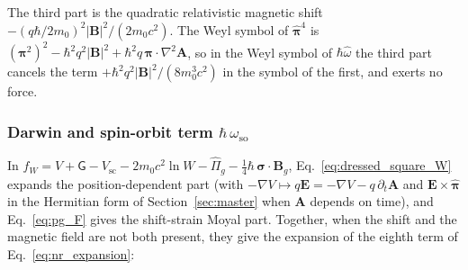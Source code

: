\documentclass[aps,prd,onecolumn,tightenlines,nofootinbib,notitlepage,11pt,floatfix]{revtex4-2}
\theoremstyle{indentedtheorem}
\begin{document}
The third part is the quadratic relativistic magnetic shift $-(q\hbar/2m_0)^2|\mathbf{B}|^2/(2m_0c^2)$. The Weyl symbol of $\hat{\boldsymbol{\pi}}^4$ is $(\boldsymbol{\pi}^2)^2-\hbar^2q^2|\mathbf{B}|^2+\hbar^2q\,\boldsymbol{\pi}\cdot\nabla^2\mathbf{A}$, so in the Weyl symbol of $\hbar\hat{\omega}$ the third part cancels the term $+\hbar^2q^2|\mathbf{B}|^2/(8m_0^3c^2)$ in the symbol of the first, and exerts no force.

\subsubsection{Darwin and spin-orbit term \texorpdfstring{$\hbar\,\omega_\text{so}$}{hbar omega so}}
\label{sec:term_so}

In $f_W = V + \mathsf{G} - V_\text{sc} - 2m_0c^2\ln W - \hat{\Pi}_g - \tfrac{1}{4}\hbar\,\boldsymbol{\sigma}\cdot\mathbf{B}_g$, Eq.~\eqref{eq:dressed_square_W} expands the position-dependent part (with $-\nabla V \mapsto q\mathbf{E} = -\nabla V - q\,\partial_t\mathbf{A}$ and $\mathbf{E}\times\hat{\boldsymbol{\pi}}$ in the Hermitian form of Section~\ref{sec:master} when $\mathbf{A}$ depends on time), and Eq.~\eqref{eq:pg_F} gives the shift-strain Moyal part. Together, when the shift and the magnetic field are not both present, they give the expansion of the eighth term of Eq.~\eqref{eq:nr_expansion}:
\end{document}
